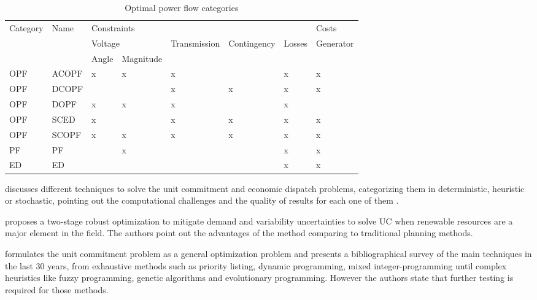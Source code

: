 \documentclass[12pt,LUDisStyle,twosided]{book}
\begin{document}
\begin{table}[h!]
\centering
\caption{Optimal power flow categories \cite{cain}}
\label{table:PowerSystemsCat}
\begin{tabular}{|l|l|l|l|l|l|l|l|}
\hline
\multirow{3}{*}{Category} & \multirow{3}{*}{Name} & \multicolumn{5}{l|}{Constraints} & Costs \\ \cline{3-8} 
 &  & \multicolumn{2}{l|}{Voltage} & \multirow{2}{*}{Transmission} & \multirow{2}{*}{Contingency} & \multirow{2}{*}{Losses} & \multirow{2}{*}{Generator} \\ \cline{3-4}
 &  & Angle & Magnitude &  &  &  &  \\ \hline
OPF & ACOPF & x & x & x &  & x & x \\ \hline
OPF & DCOPF &  &  & x & x & x & x \\ \hline
OPF & DOPF & x & x & x &  & x &  \\ \hline
OPF & SCED & x &  & x & x & x & x \\ \hline
OPF & SCOPF & x & x & x & x & x & x \\ \hline
PF & PF &  & x &  &  & x & x \\ \hline
ED & ED &  &  &  &  & x & x \\ \hline
\end{tabular}
\end{table}


\citeauthor{yamin} \cite{yamin} discusses different techniques to solve the unit commitment and economic dispatch problems, categorizing them in deterministic, heuristic or stochastic, pointing out the computational challenges and the quality of results for each one of them . 

\citeauthor{bertsimas} \cite{bertsimas} proposes a two-stage robust optimization to mitigate demand and variability uncertainties to solve UC when renewable resources are a major element in the field. The authors point out the advantages of the method comparing to traditional planning methods. 

\citeauthor{padhy} \cite{padhy} formulates the unit commitment problem as a general optimization problem and presents a bibliographical survey of the main techniques in the last 30 years, from exhaustive methods such as priority listing, dynamic programming, mixed integer-programming until complex heuristics like fuzzy programming, genetic algorithms and evolutionary programming. However the authors state that further testing is required for those methods.
\end{document}
